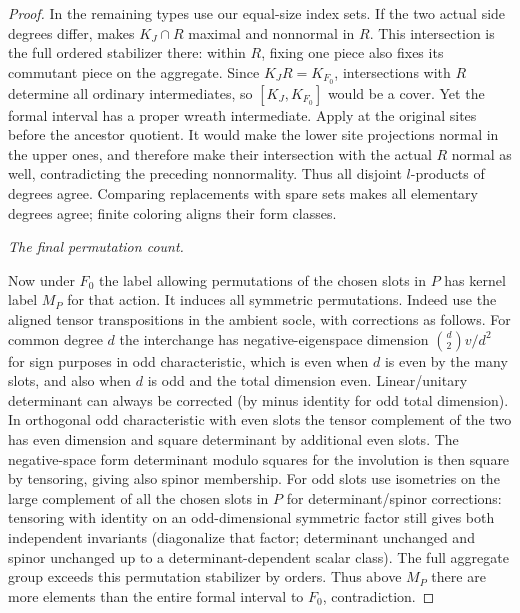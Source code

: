 \begin{proof}
In the remaining types use our equal-size index sets.  If the two
actual side degrees differ,  makes
\(K_J\cap R\) maximal and nonnormal in \(R\).  This intersection
is the full ordered stabilizer there: within \(R\), fixing one piece
also fixes its commutant piece on the aggregate.  Since
\(K_JR=K_{F_0}\), intersections with \(R\) determine all ordinary
intermediates, so \([K_J,K_{F_0}]\) would be a cover.  Yet the
formal interval has a proper wreath intermediate.
Apply  at the original sites before the
ancestor quotient.  It would make the lower site projections normal
in the upper ones, and therefore make their intersection with the
actual \(R\) normal as well, contradicting the preceding
nonnormality.  Thus all disjoint \(l\)-products of degrees agree.
Comparing replacements with spare sets makes all elementary degrees
agree; finite coloring aligns their form classes.

\noindent\emph{The final permutation count.}

Now under \(F_0\) the label allowing permutations of the chosen slots in \(P\) has kernel label \(M_P\) for that action. It induces all symmetric permutations. Indeed use the aligned tensor transpositions in the ambient socle, with corrections as follows. For common degree \(d\) the interchange has negative-eigenspace dimension \(\binom d2 v/d^2\) for sign purposes in odd characteristic, which is even when \(d\) is even by the many slots, and also when \(d\) is odd and the total dimension even. Linear/unitary determinant can always be corrected (by minus identity for odd total dimension). In orthogonal odd characteristic with even slots the tensor complement of the two has even dimension and square determinant by additional even slots. The negative-space form determinant modulo squares for the involution is then square by tensoring, giving also spinor membership. For odd slots use isometries on the large complement of all the chosen slots in \(P\) for determinant/spinor corrections: tensoring with identity on an odd-dimensional symmetric factor still gives both independent invariants (diagonalize that factor; determinant unchanged and spinor unchanged up to a determinant-dependent scalar class). The full aggregate group exceeds this permutation stabilizer by orders. Thus above \(M_P\) there are more elements than the entire formal interval to \(F_0\), contradiction.

\end{proof}

